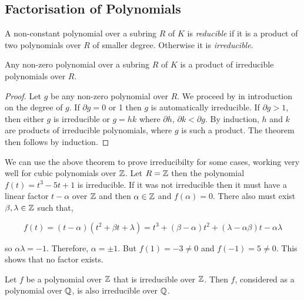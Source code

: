 \subsection{Factorisation of Polynomials}
\begin{definition}
     A non-constant polynomial over a subring $R$ of $K$ is \textit{reducible} if it is a product of two polynomials over $R$ of smaller degree. Otherwise it is \textit{irreducible}.
\end{definition}

\begin{theorem}
    Any non-zero polynomial over a subring $R$ of $K$ is a product of irreducible polynomials over $R$.
\end{theorem}

\begin{proof}
    Let $g$ be any non-zero polynomial over $R$. We proceed by in introduction on the degree of $g$. If $\partial g = 0$ or 1 then $g$ is automatically irreducible. If $\partial g > 1$, then either $g$ is irreducible or $g = hk$ where $\partial h$, $\partial k < \partial g$. By induction, $h$ and $k$ are products of irreducible polynomials, where $g$ is such a product. The theorem then follows by induction.
\end{proof}

\begin{example}
    We can use the above theorem to prove irreducibilty for some cases, working very well for cubic polynomials over $\mathbb Z$. Let $R = \mathbb Z$ then the polynomial $f(t) = t^3 -5 t + 1$ is irreducible. If it was not irreducible then it must have a linear factor $t - \alpha$ over $\mathbb Z$ and then $\alpha \in \mathbb Z$ and $f(\alpha) = 0$. There also must exist $\beta, \lambda \in \mathbb Z$ such that,

    $$
    f(t) = (t-\alpha)(t^2 + \beta t + \lambda) = t^3 + (\beta - \alpha)t^2 + (\lambda - \alpha \beta)t - \alpha \lambda
    $$

    so $\alpha \lambda = -1$. Therefore, $\alpha = \pm 1$. But $f(1) = -3 \neq 0$ and $f(-1) = 5 \neq 0$. This shows that no factor exists.
\end{example}

\begin{lemma}
     Let $f$ be a polynomial over $\mathbb Z$ that is irreducible over $\mathbb Z$. Then $f$, considered as a polynomial over $\mathbb Q$, is also irreducible over $\mathbb Q$.
\end{lemma}

